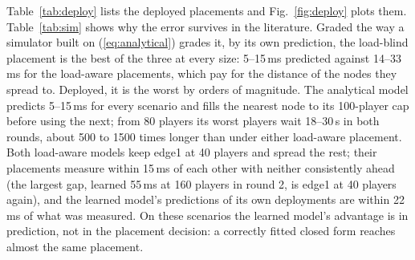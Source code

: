 \documentclass[conference]{IEEEtran}
\begin{document}
\begin{table}[t]
\centering
\caption{Worst node's measured p95 (ms) for each model's placement, round 1
/ round 2 (edge1/edge2/edge3/cloud players assigned). The overloaded edge1
under the analytical placement held only 66, 63, 71 (round 1) and 52, 52, 43
(round 2) of its 80, 100 and 100; the others timed out.}
\label{tab:deploy}
\setlength{\tabcolsep}{2pt}
\end{table}

Table~\ref{tab:deploy} lists the deployed placements and Fig.~\ref{fig:deploy}
plots them.
Table~\ref{tab:sim} shows why the error survives in the literature. Graded
the way a simulator built on (\ref{eq:analytical}) grades it, by its own
prediction, the load-blind placement is the best of the three at every size:
5--15\,ms predicted against 14--33\,ms for the load-aware placements, which
pay for the distance of the nodes they spread to. Deployed, it is the worst
by orders of magnitude. The
analytical model predicts 5--15\,ms for every scenario and fills the nearest
node to its 100-player cap before using the next; from 80 players its worst
players wait 18--30\,s in both rounds, about 500 to 1500 times longer than
under either load-aware placement. Both load-aware
models keep edge1 at 40 players and spread the rest; their placements measure
within 15\,ms of each other with neither consistently ahead (the largest gap,
learned 55\,ms at 160 players in round 2, is edge1 at 40 players again), and
the learned model's predictions of its own deployments are within 22\,ms of
what was measured. On these scenarios the learned model's
advantage is in prediction, not in the placement decision: a correctly fitted
closed form reaches almost the same placement.
\end{document}
